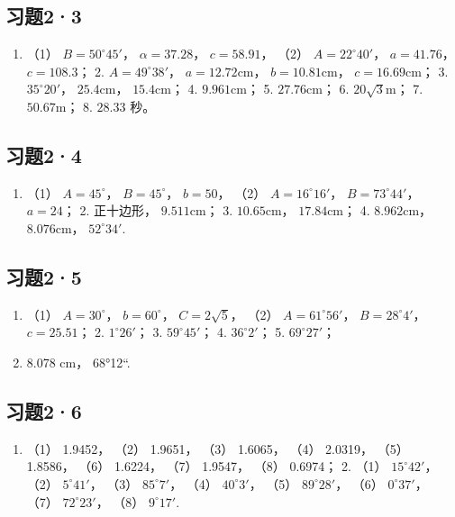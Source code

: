 \subsection{习题2·3}

\begin{enumerate}
\item
  （1） \(B = 50^{\circ}45'\)， \(\alpha = 37.28\)， \(c = 58.91\)，
  （2） \(A = 22^{\circ}40'\)， \(a = 41.76\)， \(c = 108.3\)； 2.
  \(A = 49^{\circ}38'\)， \(a = 12.72\mathrm{cm}\)，
  \(b = 10.81\mathrm{cm}\)， \(c = 16.69\mathrm{cm}\)； 3.
  \(35^{\circ}20'\)， \(25.4\mathrm{cm}\)， \(15.4\mathrm{cm}\)； 4.
  \(9.961\mathrm{cm}\)； 5. \(27.76\mathrm{cm}\)； 6.
  \(20\sqrt{3}\mathrm{m}\)； 7. \(50.67\mathrm{m}\)； 8. \(28.33\) 秒。
\end{enumerate}

\subsection{习题2·4}

\begin{enumerate}
\item
  （1） \(A = 45^{\circ}\)， \(B = 45^{\circ}\)， \(b = 50\)， （2）
  \(A = 16^{\circ}16'\)， \(B = 73^{\circ}44'\)， \(a = 24\)； 2.
  正十边形， \(9.511\mathrm{cm}\)； 3. \(10.65\mathrm{cm}\)，
  \(17.84\mathrm{cm}\)； 4. \(8.962\mathrm{cm}\)，
  \(8.076\mathrm{cm}\)， \(52^{\circ}34'\).
\end{enumerate}

\subsection{习题2·5}

\begin{enumerate}
\item
  （1） \(A = 30^{\circ}\)， \(b = 60^{\circ}\)， \(C = 2\sqrt{5}\)，
  （2） \(A = 61^{\circ}56'\)， \(B = 28^{\circ}4'\)， \(c = 25.51\)；
  2. \(1^{\circ}26'\)； 3. \(59^{\circ}45'\)； 4. \(36^{\circ}2'\)； 5.
  \(69^{\circ}27'\)；
\item
  8.078 cm， 68°12``.
\end{enumerate}

\subsection{习题2·6}

\begin{enumerate}
\item
  （1） 1.9452， （2） 1.9651， （3） 1.6065， （4） 2.0319， （5）
  1.8586， （6） 1.6224， （7） 1.9547， （8） 0.6974； 2. （1）
  \(15^{\circ}42'\)， （2） \(5^{\circ}41'\)， （3） \(85^{\circ}7'\)，
  （4） \(40^{\circ}3'\)， （5） \(89^{\circ}28'\)， （6）
  \(0^{\circ}37'\)， （7） \(72^{\circ}23'\)， （8） \(9^{\circ}17'\).
\end{enumerate}

